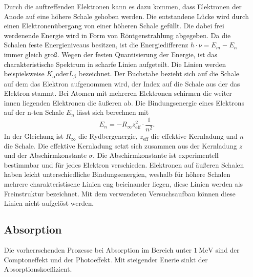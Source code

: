 Durch die auftreffenden Elektronen kann es dazu kommen, dass Elektronen der Anode auf eine höhere Schale 
gehoben werden. Die entstandene Lücke wird durch einen Elektronenübergang von einer höheren Schale gefüllt.
Die dabei frei werdenende Energie wird in Form von Röntgenstrahlung abgegeben. Da die Schalen feste Energieniveaus besitzen,
ist die Energiedifferenz $h \cdot ν = E_m - E_n$ immer gleich groß. Wegen der festen Quantisierung der Energie,
ist das charakteristische Spektrum in scharfe Linien aufgeteilt.
Die Linien werden beispielsweise $K_α \text{oder} L_β$ bezeichnet. Der Buchstabe bezieht sich auf die 
Schale auf dem das Elektron aufgenommen wird, der Index auf die Schale aus der das Elektron stammt.
Bei Atomen mit mehreren Elektronen schirmen die weiter innen liegenden Elektronen die äußeren ab.
Die Bindungsenergie eines Elektrons auf der n-ten Schale $E_n$ lässt sich berechnen mit
\begin{equation*}\label{eq:Bindungsenergie}
    E_n = -R_\infty z_{\text{eff}}^2 \cdot \frac{1}{n^2}.
\end{equation*}
In der Gleichung ist $R_\infty$ die Rydbergenergie, $z_{\text{eff}}$ die effektive Kernladung und $n$ die Schale.
Die effektive Kernladung setzt sich zusammen aus der Kernladung $z$ und der Abschirmkonstante $σ$.
Die Abschirmkonstante ist experimentell bestimmbar und für jedes Elektron verschieden.
Elektronen auf äußeren Schalen haben leicht unterschiedliche Bindungsenergien, weshalb für höhere Schalen
mehrere charakteristische Linien eng beieinander liegen, diese Linien werden als Freinstruktur bezeichnet. Mit dem verwendeten Versuchsaufbau können diese Linien nicht aufgelöst werden.
\\

\subsection{Absorption}
\label{sec:Absorption}

Die vorherrschenden Prozesse bei Absorption im Bereich unter $\SI{1}{\mega\eV}$ sind der Comptoneffekt und
der Photoeffekt. Mit steigender Enerie sinkt der Absorptionskoeffizient.

